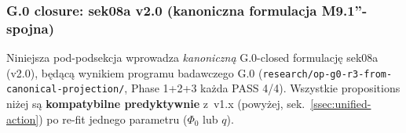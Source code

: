 %
%
%

\subsubsection{G.0 closure: sek08a v2.0 (kanoniczna formulacja M9.1''-spojna)}%
\label{sssec:g0-closure-v2}


Niniejsza pod-podsekcja wprowadza \emph{kanoniczn\k{a}} G.0-closed
formulacj\k{e} sek08a (v2.0), b\k{e}d\k{a}c\k{a} wynikiem programu badawczego
G.0 (\texttt{research/op-g0-r3-from-canonical-projection/},
Phase 1+2+3 ka\.zda PASS 4/4). Wszystkie propositions ni\.zej s\k{a}
\textbf{kompatybilne predyktywnie} z~v1.x (powy\.zej, sek.~\ref{ssec:unified-action})
po re-fit jednego parametru ($\Phi_0$ lub $q$).


